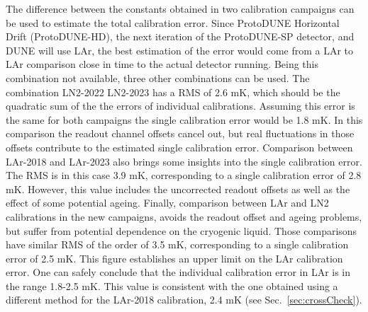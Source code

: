 The difference between the constants obtained in two calibration campaigns can be used to estimate the total calibration error. Since ProtoDUNE Horizontal Drift (ProtoDUNE-HD), the next iteration of the ProtoDUNE-SP detector, and DUNE will use LAr, the best estimation of the error would come from a LAr to LAr comparison close in time to the actual detector running. Being this combination not available, three other combinations can be used. The combination LN2-2022 LN2-2023 has a RMS of 2.6 mK, which should be the quadratic sum of the the errors of individual calibrations. Assuming this error is the same for both campaigns the single calibration error would be 1.8 mK. In this comparison the readout channel offsets cancel out, but real fluctuations in those offsets contribute to the estimated single calibration error. Comparison between LAr-2018 and LAr-2023 also brings some insights into the single calibration error. The RMS is in this case 3.9 mK, corresponding to a single calibration error of 2.8 mK. However, this value includes the uncorrected readout offsets as well as the effect of some potential ageing. Finally, comparison between LAr and LN2 calibrations in the new campaigns, avoids the readout offset and ageing problems, but suffer from potential dependence on the cryogenic liquid. Those comparisons have similar RMS of the order of 3.5 mK, corresponding to a single calibration error of 2.5 mK. This figure establishes an upper limit on the LAr calibration error. One can safely conclude that the individual calibration error in LAr is in the range 1.8-2.5 mK. This value is consistent with the one obtained using a different method for the LAr-2018 calibration, 2.4 mK (see Sec.~\ref{sec:crossCheck}).